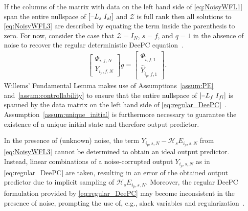 If the columns of the matrix with data on the left hand side of \eqref{eq:NoisyWFL1} span the entire nullspace of $\left[\shortminus L_s\;I_{sl}\right]$ and $\mathcal{Z}$ is full rank then all solutions to \eqref{eq:NoisyWFL3} are described by equating the term inside the parenthesis to zero. For now, consider the case that $\mathcal{Z}=I_N$, $s=f$, and $q=1$ in the absence of noise to recover the regular deterministic \ac{DeePC} equation~\citep{Coulson2019}. %
\begin{align}\label{eq:regular_DeePC}
    \begin{bmatrix}
        \Phi_{i,f,N}\\
        Y_{i_p,f,N}
    \end{bmatrix}g=%
    \begin{bmatrix}
        \Phi_{\hat{i},f,1}\\
        \widehat{Y}_{\hat{i}_p,f,1}
    \end{bmatrix}.
\end{align}
Willems' Fundamental Lemma makes use of Assumptions~\ref{assum:PE} and~\ref{assum:controllability} to ensure that the entire nullspace of $\left[\shortminus L_f\;I_{fl}\right]$ is spanned by the data matrix on the left hand side of \eqref{eq:regular_DeePC}~\citep{Willems2005}. Assumption~\ref{assum:unique_initial} is furthermore necessary to guarantee the existence of a unique initial state and therefore output predictor. %

In the presence of (unknown) noise, the term $Y_{i_p,s,N}-\mathcal{H}_s E_{i_p,s,N}$ from \eqref{eq:NoisyWFL3} cannot be determined to obtain an ideal output predictor. Instead, linear combinations of a noise-corrupted output $Y_{i_p,s,N}$ as in \eqref{eq:regular_DeePC} are taken, resulting in an error of the obtained output predictor due to implicit sampling of $\mathcal{H}_s E_{i_p,s,N}$. Moreover, the regular \ac{DeePC} formulation provided by \eqref{eq:regular_DeePC} may become inconsistent in the presence of noise, prompting the use of, e.g., slack variables and regularization~\citep{Coulson2019}.
%
